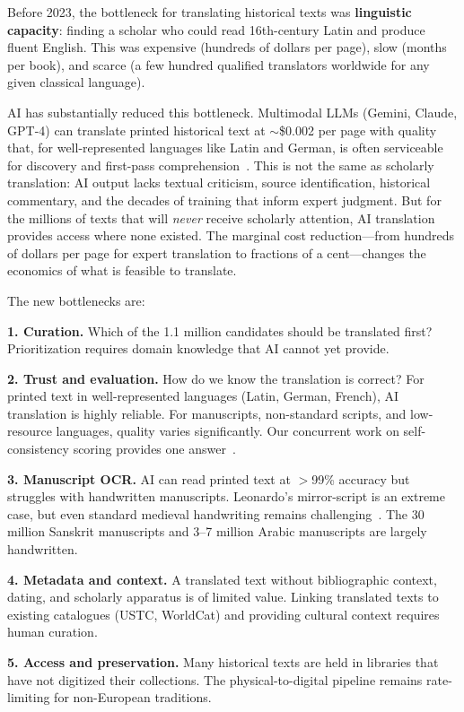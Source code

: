 \documentclass[10pt,twocolumn]{article}
\begin{document}
Before 2023, the bottleneck for translating historical texts was \textbf{linguistic capacity}: finding a scholar who could read 16th-century Latin and produce fluent English. This was expensive (hundreds of dollars per page), slow (months per book), and scarce (a few hundred qualified translators worldwide for any given classical language).

AI has substantially reduced this bottleneck. Multimodal LLMs (Gemini, Claude, GPT-4) can translate printed historical text at ${\sim}$\$0.002 per page with quality that, for well-represented languages like Latin and German, is often serviceable for discovery and first-pass comprehension~\cite{humphries2024,volk2024}. This is not the same as scholarly translation: AI output lacks textual criticism, source identification, historical commentary, and the decades of training that inform expert judgment. But for the millions of texts that will \emph{never} receive scholarly attention, AI translation provides access where none existed. The marginal cost reduction---from hundreds of dollars per page for expert translation to fractions of a cent---changes the economics of what is feasible to translate.

The new bottlenecks are:

\textbf{1. Curation.} Which of the 1.1 million candidates should be translated first? Prioritization requires domain knowledge that AI cannot yet provide.

\textbf{2. Trust and evaluation.} How do we know the translation is correct? For printed text in well-represented languages (Latin, German, French), AI translation is highly reliable. For manuscripts, non-standard scripts, and low-resource languages, quality varies significantly. Our concurrent work on self-consistency scoring provides one answer~\cite{lomas2026ocr}.

\textbf{3. Manuscript OCR.} AI can read printed text at $>$99\% accuracy but struggles with handwritten manuscripts. Leonardo's mirror-script is an extreme case, but even standard medieval handwriting remains challenging~\cite{lomas2026ocr}. The 30 million Sanskrit manuscripts and 3--7 million Arabic manuscripts are largely handwritten.

\textbf{4. Metadata and context.} A translated text without bibliographic context, dating, and scholarly apparatus is of limited value. Linking translated texts to existing catalogues (USTC, WorldCat) and providing cultural context requires human curation.

\textbf{5. Access and preservation.} Many historical texts are held in libraries that have not digitized their collections. The physical-to-digital pipeline remains rate-limiting for non-European traditions.
\end{document}
